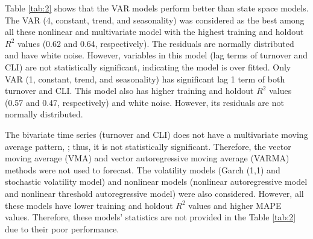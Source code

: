 Table \ref{tab:2} shows that the VAR models perform better than state space models. The VAR (4, constant, trend, and seasonality) was considered as the best among all these nonlinear and multivariate model with the highest training and holdout $R^2$ values (0.62 and 0.64, respectively). The residuals are normally distributed and have white noise. However, variables in this model (lag terms of turnover and CLI) are not statistically significant, indicating the model is over fitted. Only VAR (1, constant, trend, and seasonality) has significant lag 1 term  of both turnover and CLI. This model also has higher training and holdout $R^2$ values (0.57 and 0.47, respectively) and white noise. However, its residuals are not normally distributed. 
 
The bivariate time series (turnover and CLI) does not have a multivariate moving average pattern, ; thus, it is not  statistically significant. Therefore, the vector moving average (VMA) and vector autoregressive moving average (VARMA) methods were not used to forecast. The volatility models (Garch (1,1) and stochastic volatility model) and nonlinear models (nonlinear autoregressive model and nonlinear threshold autoregressive model) were also considered. However, all these models have lower training and holdout $R^2$ values and higher MAPE values. Therefore, these models' statistics are not provided in the Table \ref{tab:2} due to their poor performance.
